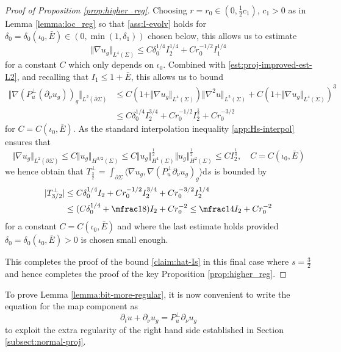 \documentclass[10pt,reqno]{amsart}
\theoremstyle{plain}
\theoremstyle{definition}
\newcommand{\pnu}{\partial_\nu}
\numberwithin{equation}{section}
\newcommand{\de}{\delta}
\newcommand{\Si}{\Sigma}
\newcommand{\norm}[1]{\Vert#1\Vert}
\newcommand{\beq}{\begin{equation}}
\newcommand{\eeq}{\end{equation}}
\newcommand{\beqa}{\begin{equation}\begin{aligned}}
\newcommand{\eeqa}{\end{aligned}\end{equation}}
\newcommand{\beqas}{\begin{equation*}\begin{aligned}}
\newcommand{\eeqas}{\end{aligned}\end{equation*}}
\newcommand{\half}{\frac{1}{2}}
\newcommand{\dd}{\mathrm{d}} %
\newcommand{\pt}{\partial_t}
\newcommand{\abs}[1]{\vert#1\vert}
\newcommand{\na}{\nabla}
\newcommand{\pSi}{{\partial \Sigma}}
\newcommand{\hf}{\frac{1}{2}} %
\newcommand{\p}{\partial} %
\newcommand{\inner}[2]{\langle #1, #2\rangle} %
\begin{document}
\begin{proof}[Proof of Proposition \ref{prop:higher_reg}]
    Choosing $r=r_0\in (0,\frac12 c_1)$, $c_1>0$ as in Lemma \ref{lemma:loc_reg} so that \eqref{ass:I-evolv} holds for $\de_0=\de_0(\iota_0,\bar E) \in (0,\min(1,\de_1))$ chosen below, this allows us to estimate 
    $$\norm{\na u_g}_{L^4(\Si)}\leq C\de_0^{1/4} I_2^{1/4}+Cr_0^{-1/2} I_1^{1/4}$$
    for a constant $C$ which only depends on $\iota_0$. Combined with \eqref{est:proj-improved-est-L2}, and recalling that $I_1 \leq 1 + \bar{E}$, this allows us to bound 
    \beqas
        \norm{\nabla\left(P_u^\perp(\p_\nu u_g)\right)_g}_{L^2(\pSi)} &\leq C(1+\norm{\na u_g}_{L^4(\Si)}) \norm{\na^2 u}_{L^2(\Si)}+C(1+\norm{\na u_g}_{L^4(\Si)})^3\\
        &\leq C \de_0^{1/4} I_2^{3/4} +Cr_0^{-1/2}I_2^\half+Cr_0^{-3/2}
    \eeqas
    for $C=C(\iota_0,\bar{E})$. As the standard interpolation inequality \eqref{app:Hs-interpol} ensures that 
    $$\norm{\nabla u_g}_{L^2(\pSi)}\leq C \norm{u_g}_{H^{3/2}(\Si)}\leq C\norm{u_g}_{H^1(\Si)}^\hf\norm{u_g}_{H^2(\Si)}^\hf\leq C I_2^\frac{1}{4}, \quad C=C(\iota_0,\bar E)$$
    we hence obtain that $T_{\frac{3}{2}}^\perp = \int_{\p\Si}\inner{\nabla u_g}{\nabla (P_u^\perp \p_\nu u_g)_g}\dd s$ is bounded by
    \beqa
        \abs{T_{3/2}^\perp}&\leq  C \de_0^{1/4} I_2+Cr_0^{-1/2} I_2^{3/4}+C r_0^{-3/2} I_2^{1/4}\\
        &\leq (C \de_0^{1/4}+\mfrac18)  I_2+ C  r_0^{-2} \leq \mfrac14 I_2 +C r_0^{-2}
    \eeqa 
    for a constant $C = C(\iota_0,\bar{E})$ and where the last estimate holds provided $\de_0=\de_0(\iota_0,\bar{E})>0$ is chosen small enough. 

    This completes the proof of the bound \eqref{claim:hat-Is} in this final case where $s=\frac32$ and hence completes the proof of the key Proposition \ref{prop:higher_reg}.
\end{proof}



To prove Lemma \ref{lemma:bit-more-regular}, it is now convenient to 
write the equation for the map component as
\beq\label{est:half-heat-flow}
    \pt u+\pnu u_g=P_u^\perp\pnu u_g
\eeq
to exploit the 
 extra regularity of the right hand side established in Section \ref{subsect:normal-proj}.
\end{document}
